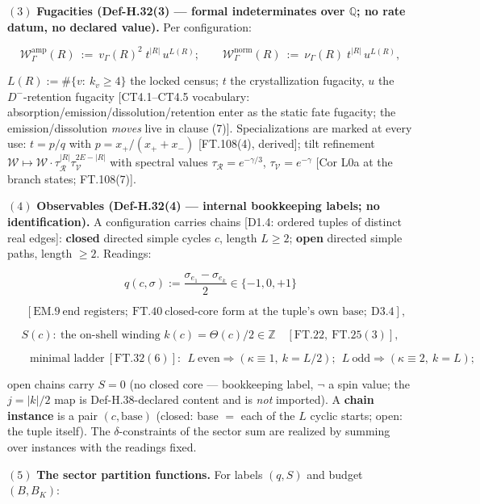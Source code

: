 \begin{definition}
$(3)$ \textbf{Fugacities (Def-H.32(3) — formal indeterminates over $\mathbb Q$; no rate datum, no declared value).} Per configuration:

\[
\mathcal W^{\mathrm{amp}}_\Gamma(R)\ :=\ v_\Gamma(R)^2\;t^{|R|}\,u^{L(R)};\qquad
\mathcal W^{\mathrm{norm}}_\Gamma(R)\ :=\ \nu_\Gamma(R)\;t^{|R|}\,u^{L(R)},
\]

$L(R):=\#\{v:\ k_v\ge4\}$ the locked census; $t$ the crystallization fugacity, $u$ the $D^-$-retention fugacity [CT4.1–CT4.5 vocabulary: absorption/emission/dissolution/retention enter as the static fate fugacity; the emission/dissolution \textit{moves} live in clause (7)]. Specializations are marked at every use: $t=p/q$ with $p=x_+/(x_++x_-)$ [FT.108(4), derived]; tilt refinement $\mathcal W\mapsto\mathcal W\cdot\tau_{\mathcal R}^{|R|}\tau_{\mathcal V}^{2E-|R|}$ with spectral values $\tau_{\mathcal R}=e^{-\gamma/3}$, $\tau_{\mathcal V}=e^{-\gamma}$ [Cor L0a at the branch states; FT.108(7)].

$(4)$ \textbf{Observables (Def-H.32(4) — internal bookkeeping labels; no identification).} A configuration carries chains [D1.4: ordered tuples of distinct real edges]: \textbf{closed} directed simple cycles $c$, length $L\ge2$; \textbf{open} directed simple paths, length $\ge2$. Readings:

\[
q(c,\sigma):=\frac{\sigma_{e_1}-\sigma_{e_k}}{2}\in\{-1,0,+1\}
\]

\[
\quad [\mathrm{EM.9}\ \text{end registers};\ \mathrm{FT.40}\ \text{closed-core form at the tuple's own base};\ \mathrm{D3.4}],
\]

\[
S(c):\ \text{the on-shell winding }k(c)=\Theta(c)/2\in\mathbb Z\quad[\mathrm{FT.22},\ \mathrm{FT.25}(3)],
\]

\[
\qquad \text{minimal ladder}\ [\mathrm{FT.32}(6)]:\ \ L\ \text{even}\Rightarrow(\kappa\equiv1,\ k=L/2);\ \ L\ \text{odd}\Rightarrow(\kappa\equiv2,\ k=L);
\]

open chains carry $S=0$ (no closed core — bookkeeping label, $\neg$ a spin value; the $j=|k|/2$ map is Def-H.38-declared content and is \textit{not} imported). A \textbf{chain instance} is a pair $(c,\text{base})$ (closed: base $=$ each of the $L$ cyclic starts; open: the tuple itself). The $\delta$-constraints of the sector sum are realized by summing over instances with the readings fixed.

$(5)$ \textbf{The sector partition functions.} For labels $(q,S)$ and budget $(B,B_K)$:


\end{definition}
